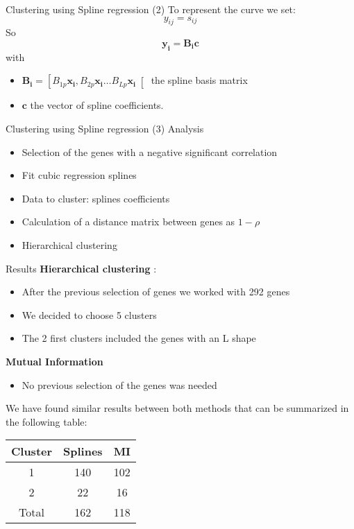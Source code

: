 \documentclass[handout]{beamer}
\begin{document}
\begin{frame}{Clustering using Spline regression (2)}
To represent the curve we set:
\[y_{ij}=s_{ij}\]
So
\[ \mathbf{y_i}=\mathbf{B_i}\mathbf{c}\]
with
\begin {itemize}
\item $\mathbf{B_i}=\left[ B_{1p}\mathbf{x_{i}},B_{2p}\mathbf{x_{i}} \ldots B_{Lp}\mathbf{x_{i}} \right[$ the spline basis matrix
\item $\mathbf{c}$ the vector of spline coefficients.
\end{itemize}

\end{frame}

\begin{frame}{Clustering using Spline regression (3)}
Analysis

\begin {itemize}
\item Selection of the genes with a negative significant correlation
\item Fit cubic regression splines
\item Data to cluster: splines coefficients
\item Calculation of a distance matrix between genes as $1-\rho$
\item Hierarchical clustering 
\end{itemize}

\end{frame}

\begin {frame}{Results}
\textbf{Hierarchical clustering }:
\begin {itemize}
\item After the previous selection of genes we worked with 292 genes
\item We decided to choose 5 clusters
\item The 2 first clusters included the genes with an L shape
\end{itemize}
\textbf{Mutual Information}
\begin{itemize}
\item No previous selection of the genes was needed
\end{itemize}
We have found similar results between both methods that can be summarized in the following table:
\begin{tabular}{|c|c|c|}
\hline
Cluster & Splines & MI \\
\hline
1 & 140 &102 \\
2 & 22 & 16 \\
Total & 162 & 118
\hline
\end{tabular}

\end{frame}

\end{document}
